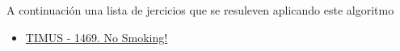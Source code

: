 A continuación una lista de jercicios que se resuleven aplicando este algoritmo

\begin{itemize}
	\item \href{https://acm.timus.ru/problem.aspx?space=1&num=1469}{ TIMUS - 1469. No Smoking!}
\end{itemize}